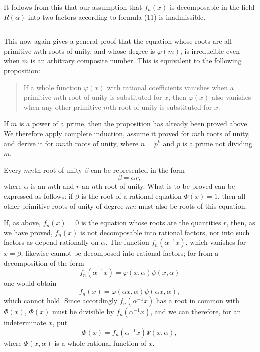 \documentclass[11pt]{article}
\begin{document}
It follows from this that our assumption that $f_n(x)$ is decomposable in the field $R(\alpha)$ into two factors according to formula (11) is inadmissible.

\medskip\hrule\medskip

This now again gives a general proof that the equation whose roots are all primitive $m$th roots of unity, and whose degree is $\varphi(m)$, is irreducible even when $m$ is an arbitrary composite number. This is equivalent to the following proposition:

\begin{quote}
If a whole function $\varphi(x)$ with rational coefficients vanishes when a primitive $m$th root of unity is substituted for $x$, then $\varphi(x)$ also vanishes when any other primitive $m$th root of unity is substituted for $x$.
\end{quote}

If $m$ is a power of a prime, then the proposition has already been proved above. We therefore apply complete induction, assume it proved for $m$th roots of unity, and derive it for $mn$th roots of unity, where $n=p^k$ and $p$ is a prime not dividing $m$.

Every $mn$th root of unity $\beta$ can be represented in the form
\[
\beta=\alpha r,
\]
where $\alpha$ is an $m$th and $r$ an $n$th root of unity. What is to be proved can be expressed as follows: if $\beta$ is the root of a rational equation $\Phi(x)=1$, then all other primitive roots of unity of degree $mn$ must also be roots of this equation.

If, as above, $f_n(x)=0$ is the equation whose roots are the quantities $r$, then, as we have proved, $f_n(x)$ is not decomposable into rational factors, nor into such factors as depend rationally on $\alpha$. The function $f_n(\alpha^{-1}x)$, which vanishes for $x=\beta$, likewise cannot be decomposed into rational factors; for from a decomposition of the form
\[
f_n(\alpha^{-1}x)=\varphi(x,\alpha)\psi(x,\alpha)
\]
one would obtain
\[
f_n(x)=\varphi(\alpha x,\alpha)\psi(\alpha x,\alpha),
\]
which cannot hold. Since accordingly $f_n(\alpha^{-1}x)$ has a root
in common with $\Phi(x)$, $\Phi(x)$ must be divisible by $f_n(\alpha^{-1}x)$, and we can therefore, for an indeterminate $x$, put
\begin{equation}\tag{18}
\Phi(x)=f_n(\alpha^{-1}x)\Psi(x,\alpha),
\end{equation}
where $\Psi(x,\alpha)$ is a whole rational function of $x$.
\end{document}
